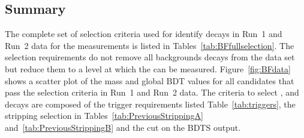 \subsection{Summary}
\label{sec:BFsummary}
The complete set of selection criteria used for identify \bmumu decays in Run~1 and Run~2 data for the \BF measurements is listed in Tables~\ref{tab:BFfullselection}. %
The selection requirements do not remove all backgrounds decays from the data set but reduce them to a level at which the \BFs can be measured. Figure~\ref{fig:BFdata} shows a scatter plot of the mass and global BDT values for all candidates that pass the selection criteria in Run~1 and Run~2 data.
The criteria to select \bhh, \bujpsik and \bsjpsiphi decays are composed of the trigger requirements listed Table~\ref{tab:triggers}, the stripping selection in Tables~\ref{tab:PreviousStrippingA} and~\ref{tab:PreviousStrippingB} and the cut on the BDTS output.


